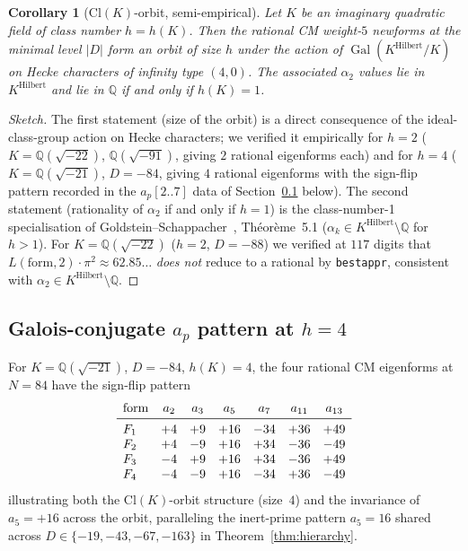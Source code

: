 \documentclass[12pt]{amsart}
\newtheorem{corollary}[theorem]{Corollary}
\theoremstyle{definition}
\DeclareMathOperator{\Gal}{Gal}
\newcommand{\Q}{\mathbb{Q}}
\begin{document}
\begin{corollary}[Cl$(K)$-orbit, semi-empirical]\label{cor:CK-orbit}
Let $K$ be an imaginary quadratic field of class number $h = h(K)$.
Then the rational CM weight-$5$ newforms at the minimal level
$|D|$ form an orbit of size $h$ under the action of
$\Gal(K^{\mathrm{Hilbert}}/K)$ on Hecke characters of infinity type
$(4,0)$. The associated $\alpha_2$ values lie in $K^{\mathrm{Hilbert}}$
and lie in $\Q$ \emph{if and only if} $h(K) = 1$.
\end{corollary}

\begin{proof}[Sketch]
The first statement (size of the orbit) is a direct consequence of the
ideal-class-group action on Hecke characters; we verified it
empirically for $h = 2$ ($K = \Q(\sqrt{-22})$, $\Q(\sqrt{-91})$,
giving $2$ rational eigenforms each) and for $h = 4$
($K = \Q(\sqrt{-21})$, $D = -84$, giving $4$ rational
eigenforms with the sign-flip pattern recorded in the
$a_p[2..7]$ data of Section~\ref{ssec:CK-orbit-ap} below).
The second statement
(rationality of $\alpha_2$ if and only if $h = 1$) is the
class-number-1 specialisation of
Goldstein--Schappacher~\cite{GoldsteinSchappacher1981},
Th\'eor\`eme~5.1 ($\alpha_k \in K^{\mathrm{Hilbert}} \setminus \Q$
for $h > 1$). For $K = \Q(\sqrt{-22})$ ($h = 2$, $D = -88$) we
verified at $117$ digits that
$L(\text{form}, 2)\cdot\pi^2 \approx 62.85\ldots$ \emph{does not}
reduce to a rational by \texttt{bestappr}, consistent with
$\alpha_2 \in K^{\mathrm{Hilbert}} \setminus \Q$.
\end{proof}

\subsection{Galois-conjugate $a_p$ pattern at $h = 4$}
\label{ssec:CK-orbit-ap}

For $K = \Q(\sqrt{-21})$, $D = -84$, $h(K) = 4$, the four rational
CM eigenforms at $N = 84$ have the sign-flip pattern
\[
  \begin{array}{lcccccc}
    \text{form} & a_2 & a_3 & a_5 & a_7 & a_{11} & a_{13} \\\midrule
    F_1 & +4 & +9 & +16 & -34 & +36 & +49 \\
    F_2 & +4 & -9 & +16 & +34 & -36 & -49 \\
    F_3 & -4 & +9 & +16 & +34 & -36 & +49 \\
    F_4 & -4 & -9 & +16 & -34 & +36 & -49
  \end{array}
\]
illustrating both the Cl$(K)$-orbit structure (size~$4$) and the
invariance of $a_5 = +16$ across the orbit, paralleling the inert-prime
pattern $a_5 = 16$ shared across $D \in \{-19,-43,-67,-163\}$ in
Theorem~\ref{thm:hierarchy}.
\end{document}
